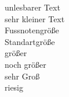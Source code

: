 \documentclass[a4paper, pdftex, 12pt, ngerman]{article}
\begin{document}
\tiny unlesbarer Text \\
\scriptsize sehr kleiner Text \\
\footnotesize Fussnotengröße \\
\normalsize Standartgröße \\
\large größer \\
\Large noch größer \\	
\LARGE sehr Groß \\
\huge riesig \\
\end{document}
